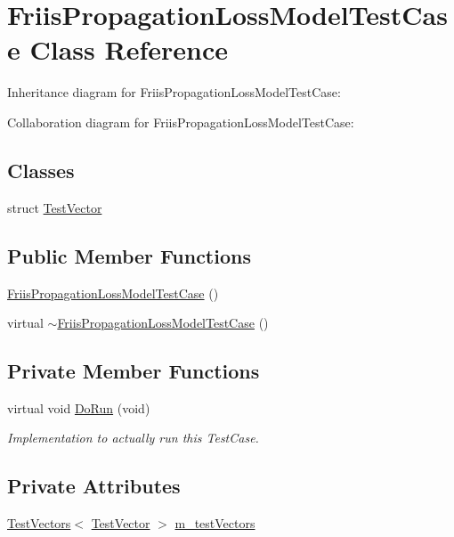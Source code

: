 \hypertarget{classFriisPropagationLossModelTestCase}{}\section{Friis\+Propagation\+Loss\+Model\+Test\+Case Class Reference}
\label{classFriisPropagationLossModelTestCase}


Inheritance diagram for Friis\+Propagation\+Loss\+Model\+Test\+Case\+:


Collaboration diagram for Friis\+Propagation\+Loss\+Model\+Test\+Case\+:
\subsection*{Classes}
\begin{DoxyCompactItemize}
\item 
struct \hyperlink{structFriisPropagationLossModelTestCase_1_1TestVector}{Test\+Vector}
\end{DoxyCompactItemize}
\subsection*{Public Member Functions}
\begin{DoxyCompactItemize}
\item 
\hyperlink{classFriisPropagationLossModelTestCase_a2a96bda8b61b141e80139991844756d9}{Friis\+Propagation\+Loss\+Model\+Test\+Case} ()
\item 
virtual \hyperlink{classFriisPropagationLossModelTestCase_af4adb47305ab871c3f92a5f8ea399ff5}{$\sim$\+Friis\+Propagation\+Loss\+Model\+Test\+Case} ()
\end{DoxyCompactItemize}
\subsection*{Private Member Functions}
\begin{DoxyCompactItemize}
\item 
virtual void \hyperlink{classFriisPropagationLossModelTestCase_a9beb37a3138674891389344df52b2992}{Do\+Run} (void)
\begin{DoxyCompactList}\small\item\em Implementation to actually run this Test\+Case. \end{DoxyCompactList}\end{DoxyCompactItemize}
\subsection*{Private Attributes}
\begin{DoxyCompactItemize}
\item 
\hyperlink{classns3_1_1TestVectors}{Test\+Vectors}$<$ \hyperlink{structFriisPropagationLossModelTestCase_1_1TestVector}{Test\+Vector} $>$ \hyperlink{classFriisPropagationLossModelTestCase_a9fa3d0d4e10d07b03b540192c8453e00}{m\+\_\+test\+Vectors}
\end{DoxyCompactItemize}
